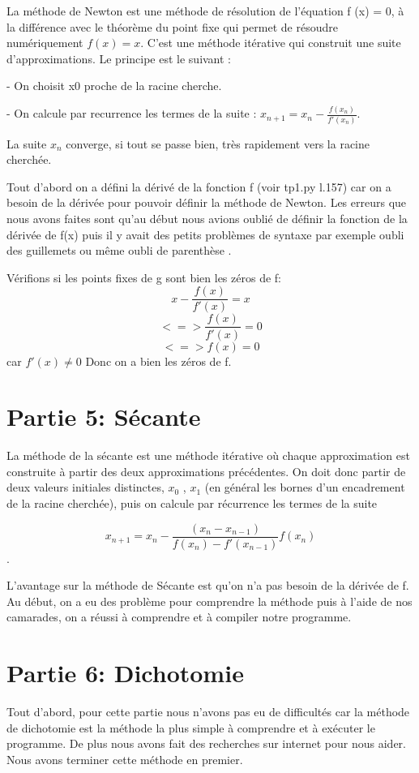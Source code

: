 \documentclass{article}
\begin{document}
La méthode de Newton est une méthode de résolution de l'équation f (x) = 0, à la différence avec le théorème du point fixe qui permet de résoudre numériquement $f (x) = x$.
 C'est une méthode itérative qui construit une suite d'approximations. Le principe est le suivant :

 - On choisit x0 proche de la racine cherche. 

  - On calcule par recurrence les termes de la suite : 
$x_{n+1} = x_{n} - \frac{f(x_{n})}{f'(x_{n})}$.
 		
$$ $$
La suite  $x_{n}$  converge, si tout se passe bien, très rapidement vers la racine cherchée.

Tout d'abord on a défini la dérivé de la fonction f (voir tp1.py l.157) car on a besoin de la dérivée pour pouvoir définir la méthode de Newton. 
Les erreurs que nous avons faites sont qu'au début nous avions oublié de définir la fonction de la dérivée de f(x) puis il y avait des petits problèmes de syntaxe par exemple oubli des guillemets ou même oubli de parenthèse . 

Vérifions si les points fixes de g sont bien les zéros de f:
$$ x-\frac{f(x)}{f'(x)}=x$$ 
$$ <=> \frac{f(x)}{f'(x)}=0$$
$$<=> f(x)=0 $$  car $f'(x) \neq  0 $
Donc on a bien les zéros de f.
$$ $$

\section{Partie 5: Sécante}
La méthode de la sécante est une méthode itérative où chaque approximation est construite à partir des deux approximations précédentes. 
On doit donc partir de deux valeurs initiales distinctes, $x_{0}$ , $x_{1}$ (en général les bornes d’un encadrement de la racine cherchée), puis on calcule par récurrence les termes de la suite 

$$x_{n+1} = x_{n}-\frac{(x_{n}-x_{n-1})}{f(x_{n})-f'(x_{n-1})} f(x_{n})$$. 

L’avantage sur la méthode de Sécante est qu’on n’a pas besoin de la dérivée de f.
Au début, on a eu des problème pour comprendre la méthode puis à l'aide de nos camarades, on a réussi à comprendre et à compiler notre programme.

 
\section{Partie 6: Dichotomie}

Tout d'abord, pour cette partie nous n'avons pas eu de difficultés car la méthode de dichotomie est la méthode la plus simple à comprendre et à exécuter le programme. De plus nous avons fait des recherches sur internet pour nous aider. Nous avons terminer cette méthode en premier. 
\end{document}
